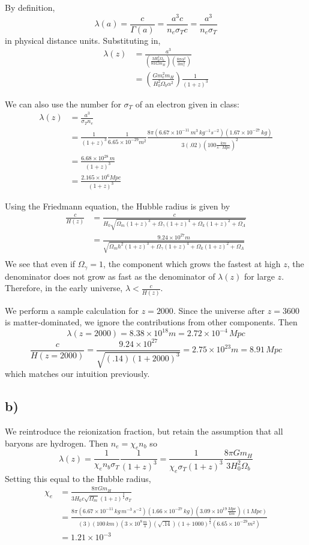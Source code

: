 \documentclass{article}
\begin{document}
By definition, 
\[\lambda(a) = \frac{c}{\Gamma(a)} = \frac{a^3 c}{n_e\sigma_T c} = \frac{a^3}{n_e\sigma_T}\]
in physical distance units. Substituting in,
\begin{align*}
\lambda(z) &= \frac{a^3}{\left(\frac{3H_0^2\Omega_b}{8\pi G m_H}\right)\left(\frac{8\pi \alpha^2}{3m_e^2}\right)}\\
&= \left(\frac{G m_e^2 m_H}{H_0^2 \Omega_b \alpha^2}\right)\frac{1}{(1+z)^3}
\end{align*}

We can also use the number for $\sigma_T$ of an electron given in class:
\begin{align*}
\lambda(z) &= \frac{a^3}{\sigma_T n_e}\\
&=\frac{1}{(1+z)^3} \frac{1}{6.65\times 10^{-29}m^2}\frac{8\pi (6.67\times 10^{-11}\,m^3\,kg^{-1}s^{-2})(1.67\times 10^{-27}\,kg)}{3(.02)(100\frac{km}{s\cdot\,Mpc})^2}\\
&= \frac{6.68\times 10^{28}\,m}{(1+z)^3}\\
&= \frac{2.165\times 10^6 Mpc}{(1+z)^3}
\end{align*}

Using the Friedmann equation, the Hubble radius is given by
\begin{align*}
\frac{c}{H(z)} &= \frac{c}{H_0\sqrt{\Omega_m (1+z)^3+\Omega_\gamma(1+z)^4+\Omega_k(1+z)^2+\Omega_\Lambda}}\\
&=\frac{9.24\times 10^{27}m}{\sqrt{\Omega_mh^2(1+z)^3+\Omega_\gamma(1+z)^4+\Omega_k(1+z)^2+\Omega_\Lambda}}\\
\end{align*}
We see that even if $\Omega_\gamma=1$, the component which grows the fastest at high $z$, the denominator does not grow as fast as the denominator of $\lambda(z)$ for large $z$. Therefore, in the early universe, $\lambda<\frac{c}{H(z)}$. 

We perform a sample calculation for $z=2000$. Since the universe after $z=3600$ is matter-dominated, we ignore the contributions from other components. Then
\[\lambda(z=2000) = 8.38\times 10^{18}m = 2.72\times 10^{-4}\,Mpc\]
\[\frac{c}{H(z=2000)} = \frac{9.24\times 10^{27}}{\sqrt{(.14)(1+2000)^3}}=2.75\times 10^{23}m = 8.91\,Mpc\]
which matches our intuition previously.

\subsection*{b)}
We reintroduce the reionization fraction, but retain the assumption that all baryons are hydrogen. Then $n_e = \chi_e n_b$ so
\[\lambda(z) = \frac{1}{\chi_e n_b\sigma_T}\frac{1}{(1+z)^3} = \frac{1}{\chi_e\sigma_T(1+z)^3}\frac{8\pi G m_H}{3 H_0^2\Omega_b}\]
Setting this equal to the Hubble radius,
\begin{align*}
\chi_e &= \frac{8\pi G m_H}{3H_0c\sqrt{\Omega_m}(1+z)^{\frac{3}{2}}\sigma_T}\\
&= \frac{8\pi (6.67\times 10^{-11}\,kg\,m^{-3}\,s^{-2})(1.66\times 10^{-27}\,kg)(3.09\times10^{19}\frac{Mpc}{km})(1\,Mpc)}{(3)(100\,km)(3\times 10^8\frac{m}{s})(\sqrt{.14})(1+1000)^{\frac{3}{2}}(6.65\times 10^{-29}m^2)}\\
&= 1.21\times 10^{-3}
\end{align*}
\end{document}

